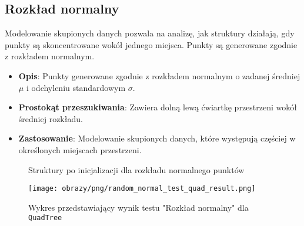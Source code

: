 \documentclass[12pt]{article}
\begin{document}
\pagebreak

\subsection{Rozkład normalny}
Modelowanie skupionych danych pozwala na analizę, jak struktury działają, gdy punkty są skoncentrowane wokół jednego miejsca. Punkty są generowane zgodnie z rozkładem normalnym.
\begin{itemize}
    \item \textbf{Opis}: Punkty generowane zgodnie z rozkładem normalnym o zadanej średniej \( \mu \) i odchyleniu standardowym \( \sigma \).
    \item \textbf{Prostokąt przeszukiwania}: Zawiera dolną lewą ćwiartkę przestrzeni wokół średniej rozkładu.
    \item \textbf{Zastosowanie}: Modelowanie skupionych danych, które występują częściej w określonych miejscach przestrzeni.
\end{itemize}

\begin{figure}[h]
    \centering
    \qquad
    \caption{Struktury po inicjalizacji dla rozkładu normalnego punktów}%
    \label{fig:random_normal}%
\end{figure}

\begin{figure}[h]
    \centering
    \texttt{[image: obrazy/png/random\_normal\_test\_quad\_result.png]}
    \caption{Wykres przedstawiający wynik testu "Rozkład normalny" dla \texttt{QuadTree}}
    \label{fig:random_normal_test_quad_result}
\end{figure}
\end{document}

